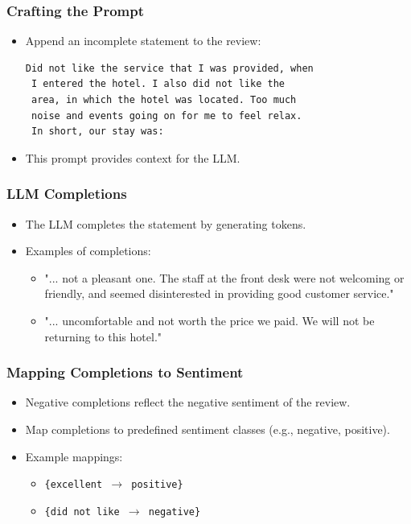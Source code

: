 \begin{frame}[fragile]
    \frametitle{Crafting the Prompt}
    \begin{itemize}
        \item Append an incomplete statement to the review:
        \begin{verbatim}
Did not like the service that I was provided, when
 I entered the hotel. I also did not like the
 area, in which the hotel was located. Too much
 noise and events going on for me to feel relax.
 In short, our stay was:

        \end{verbatim}
        \item This prompt provides context for the LLM.
    \end{itemize}
\end{frame}

\begin{frame}
    \frametitle{LLM Completions}
    \begin{itemize}
        \item The LLM completes the statement by generating tokens.
        \item Examples of completions:
        \begin{itemize}
            \item "... not a pleasant one. The staff at the front desk were not welcoming or friendly, and seemed disinterested in providing good customer service."
            \item "... uncomfortable and not worth the price we paid. We will not be returning to this hotel."
        \end{itemize}
    \end{itemize}
\end{frame}

\begin{frame}
    \frametitle{Mapping Completions to Sentiment}
    \begin{itemize}
        \item Negative completions reflect the negative sentiment of the review.
        \item Map completions to predefined sentiment classes (e.g., negative, positive).
        \item Example mappings:
        \begin{itemize}
            \item \texttt{\{excellent $\rightarrow$ positive\}}
            \item \texttt{\{did not like $\rightarrow$ negative\}}
        \end{itemize}
    \end{itemize}
\end{frame}


